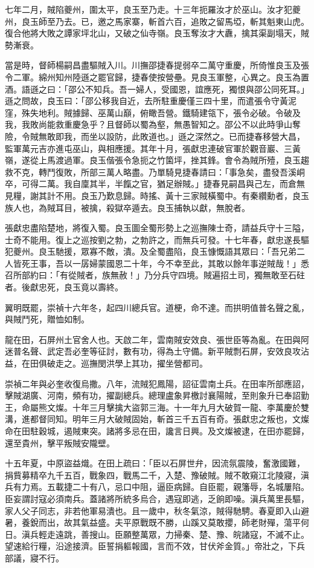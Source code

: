 \begin{pinyinscope}
七年二月，賊陷夔州，圍太平，良玉至乃走。十三年扼羅汝才於巫山。汝才犯夔州，良玉師至乃去。已，邀之馬家寨，斬首六百，追敗之留馬埡，斬其魁東山虎。復合他將大敗之譚家坪北山，又破之仙寺嶺。良玉奪汝才大纛，擒其渠副塌天，賊勢漸衰。

當是時，督師楊嗣昌盡驅賊入川。川撫邵捷春提弱卒二萬守重慶，所倚惟良玉及張令二軍。綿州知州陸遜之罷官歸，捷春使按營壘。見良玉軍整，心異之。良玉為置酒。語遜之曰：「邵公不知兵。吾一婦人，受國恩，誼應死，獨恨與邵公同死耳。」遜之問故，良玉曰：「邵公移我自近，去所駐重慶僅三四十里，而遣張令守黃泥窪，殊失地利。賊據歸、巫萬山巔，俯瞰吾營。鐵騎建瓴下，張令必破。令破及我，我敗尚能救重慶急乎？且督師以蜀為壑，無愚智知之。邵公不以此時爭山奪險，令賊無敢即我，而坐以設防，此敗道也。」遜之深然之。已而捷春移營大昌，監軍萬元吉亦進屯巫山，與相應援。其年十月，張獻忠連破官軍於觀音巖、三黃嶺，遂從上馬渡過軍。良玉偕張令急扼之竹箘坪，挫其鋒。會令為賊所殪，良玉趨救不克，轉鬥復敗，所部三萬人略盡。乃單騎見捷春請曰：「事急矣，盡發吾溪峒卒，可得二萬。我自廩其半，半餼之官，猶足辦賊。」捷春見嗣昌與己左，而倉無見糧，謝其計不用。良玉乃歎息歸。時搖、黃十三家賊橫蜀中。有秦纘勳者，良玉族人也，為賊耳目，被擒，殺獄卒遁去。良玉捕執以獻，無脫者。

張獻忠盡陷楚地，將復入蜀。良玉圖全蜀形勢上之巡撫陳士奇，請益兵守十三隘，士奇不能用。復上之巡按劉之勃，之勃許之，而無兵可發。十七年春，獻忠遂長驅犯夔州。良玉馳援，眾寡不敵，潰。及全蜀盡陷，良玉慷慨語其眾曰：「吾兄弟二人皆死王事，吾以一孱婦蒙國恩二十年，今不幸至此，其敢以餘年事逆賊哉！」悉召所部約曰：「有從賊者，族無赦！」乃分兵守四境。賊遍招土司，獨無敢至石砫者。後獻忠死，良玉竟以壽終。

翼明既罷，崇禎十六年冬，起四川總兵官。道梗，命不達。而拱明值普名聲之亂，與賊鬥死，贈恤如制。

龍在田，石屏州土官舍人也。天啟二年，雲南賊安效良、張世臣等為亂。在田與阿迷普名聲、武定吾必奎等征討，數有功，得為土守備。新平賊剽石屏，安效良攻沾益，在田俱破走之。巡撫閔洪學上其功，擢坐營都司。

崇禎二年與必奎收復烏撒。八年，流賊犯鳳陽，詔征雲南土兵。在田率所部應詔，擊賊湖廣、河南，頻有功，擢副總兵。總理盧象昇檄討襄陽賊，至則象升已奉詔勤王，命屬熊文燦。十年三月擊擒大盜郭三海。十一年九月大破賀一龍、李萬慶於雙溝，進都督同知。明年三月大破賊固始，斬首三千五百有奇。張獻忠之叛也，文燦命在田駐穀城，遏賊東突。諸將多忌在田，讒言日興。及文燦被逮，在田亦罷歸，還至貴州，擊平叛賊安隴壁。

十五年夏，中原盜益熾。在田上疏曰：「臣以石屏世弁，因流氛震陵，奮激國難，捐貲募精卒九千五百，戰象四，戰馬二千，入楚、豫破賊。賊不敢窺江北陵寢，滇兵有力焉。五載捷二十有八，忌口中阻，逼臣病歸。自臣罷，親籓辱，名城屢陷。臣妄謂討寇必須南兵。蓋諸將所統多烏合，遇寇即逃，乏餉即噪。滇兵萬里長驅，家人父子同志，非若他軍易潰也。且一歲中，秋冬氣涼，賊得馳騁。春夏即入山避暑，養銳而出，故其氣益盛。夫平原戰既不勝，山蹊又莫敢攖，師老財殫，蕩平何日。滇兵輕走遠跳，善搜山。臣願整萬眾，力掃秦、楚、豫、皖諸寇，不滅不止。望速給行糧，沿途接濟。臣誓捐軀報國，言而不效，甘伏斧金質。」帝壯之，下兵部議，寢不行。


\end{pinyinscope}
